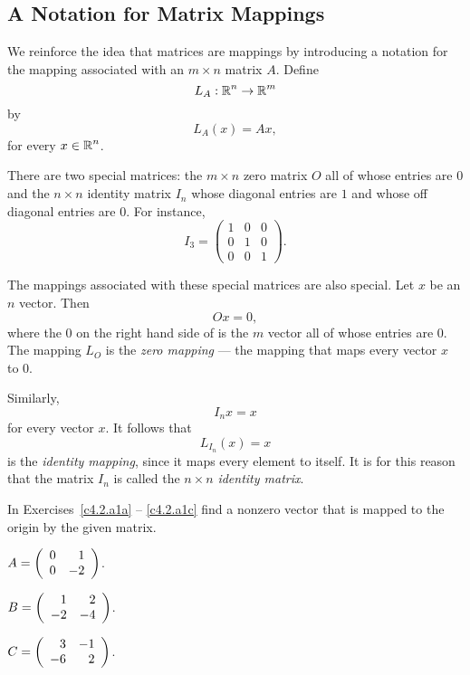 \documentclass{ximera}
\begin{document}
\subsection*{A Notation for Matrix Mappings}

We reinforce the idea that matrices are mappings by introducing a notation 
for the mapping associated with an $m\times n$ matrix $A$.  Define
\[
L_A:\mbox{$\Bbb{R}$}^n\to\mbox{$\Bbb{R}$}^m
\]
by
\[
L_A(x) = Ax,
\]
for every $x\in\mbox{$\Bbb{R}$}^n$.

There are two special matrices:  the $m\times n$ zero matrix 
 $O$ all of whose entries are $0$ and the 
$n\times n$ identity matrix  $I_n$ whose diagonal 
entries are $1$ and whose off diagonal entries are $0$.  For instance,
\[
	I_3 = \left(
\begin{array}{rrr}
 1 & 0 & 0  \\
 0 & 1 & 0  \\
 0 & 0 & 1
\end{array}
\right).
\]

The mappings associated with these special matrices are also special.  
Let $x$ be an $n$ vector.  Then
\begin{equation} \label{multby0}
Ox=0,
\end{equation}
where the $0$ on the right hand side of  is the $m$
vector all of whose entries are $0$.  The mapping $L_O$ is the 
{\em zero mapping\/}  --- the mapping 
that maps every vector $x$ to $0$.

Similarly,
\[
I_nx=x
\]
for every vector $x$.  It follows that
\[
L_{I_n}(x) = x
\]
is the {\em identity mapping\/},  since
it maps every element to itself.  It is for this reason that the
matrix $I_n$ is called the $n\times n$ {\em identity matrix\/}.

\EXER

\TEXER

\noindent In Exercises~\ref{c4.2.a1a} -- \ref{c4.2.a1c} find a nonzero
vector that is mapped to the origin by the given matrix.
\begin{exercise} \label{c4.2.a1a}
$A=\left(\begin{array}{rr} 0 & 1\\ 0 &-2\end{array}\right)$.
\end{exercise}
\begin{exercise} \label{c4.2.a1b}
$B=\left(\begin{array}{rr} 1 & 2\\ -2 &-4\end{array}\right)$.
\end{exercise}
\begin{exercise} \label{c4.2.a1c}
$C=\left(\begin{array}{rr} 3 & -1\\ -6 &2\end{array}\right)$.
\end{exercise}
\end{document}
